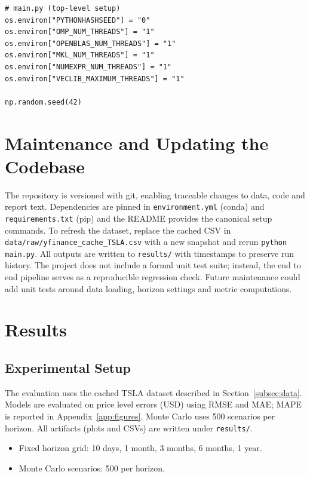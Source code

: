 \documentclass[11pt,a4paper]{article}
\begin{document}
\begin{lstlisting}[caption={Reproducibility controls (excerpt).}]
# main.py (top-level setup)
os.environ["PYTHONHASHSEED"] = "0"
os.environ["OMP_NUM_THREADS"] = "1"
os.environ["OPENBLAS_NUM_THREADS"] = "1"
os.environ["MKL_NUM_THREADS"] = "1"
os.environ["NUMEXPR_NUM_THREADS"] = "1"
os.environ["VECLIB_MAXIMUM_THREADS"] = "1"

np.random.seed(42)
\end{lstlisting}

\section{Maintenance and Updating the Codebase}
\label{sec:maintenance}
The repository is versioned with git, enabling traceable changes to data, code and report text. Dependencies are pinned in \texttt{environment.yml} (conda) and \texttt{requirements.txt} (pip) and the README provides the canonical setup commands. To refresh the dataset, replace the cached CSV in \texttt{data/raw/yfinance\_cache\_TSLA.csv} with a new snapshot and rerun \texttt{python main.py}. All outputs are written to \texttt{results/} with timestamps to preserve run history. The project does not include a formal unit test suite; instead, the end to end pipeline serves as a reproducible regression check. Future maintenance could add unit tests around data loading, horizon settings and metric computations.

\section{Results}
\label{sec:results}

\subsection{Experimental Setup}
The evaluation uses the cached TSLA dataset described in Section~\ref{subsec:data}. Models are evaluated on price level errors (USD) using RMSE and MAE; MAPE is reported in Appendix~\ref{app:figures}. Monte Carlo uses 500 scenarios per horizon. All artifacts (plots and CSVs) are written under \texttt{results/}.
\begin{itemize}
    \item Fixed horizon grid: 10 days, 1 month, 3 months, 6 months, 1 year.
    \item Monte Carlo scenarios: 500 per horizon.
\end{itemize}
\end{document}
